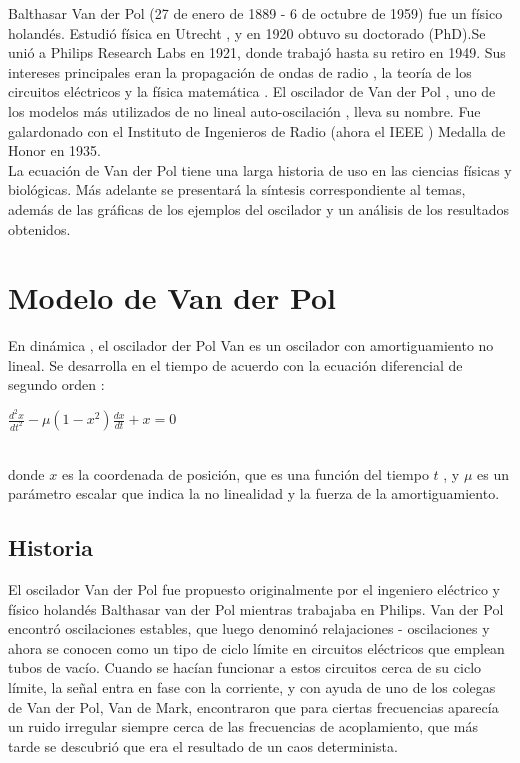 \documentclass[12pt]{article}
\begin{document}
Balthasar Van der Pol (27 de enero de 1889 - 6 de octubre de 1959) fue un físico holandés. Estudió física en Utrecht , y en 1920 obtuvo su doctorado (PhD).Se unió a Philips Research Labs en 1921, donde trabajó hasta su retiro en 1949. Sus intereses principales eran la propagación de ondas de radio , la teoría de los circuitos eléctricos y la física matemática . El oscilador de Van der Pol , uno de los modelos más utilizados de no lineal auto-oscilación , lleva su nombre. Fue galardonado con el Instituto de Ingenieros de Radio (ahora el IEEE ) Medalla de Honor en 1935. \\

La ecuación de Van der Pol tiene una larga historia de uso en las ciencias físicas y biológicas. Más adelante se presentará la síntesis correspondiente al temas, además de las gráficas de los ejemplos del oscilador y un análisis de los resultados obtenidos. 




\section*{Modelo de Van der Pol}
En dinámica , el oscilador der Pol Van es un oscilador con amortiguamiento no lineal. Se desarrolla en el tiempo de acuerdo con la ecuación diferencial de segundo orden :\\

\centerline{$\displaystyle \frac{d^2x}{dt^2} - \mu (1-x^2) \frac{dx}{dt} +x = 0$}
$ $\\
donde $x$ es la coordenada de posición, que es una función del tiempo $t$ , y $\mu$ es un parámetro escalar que indica la no linealidad y la fuerza de la amortiguamiento.




\subsection*{Historia}
El oscilador Van der Pol fue propuesto originalmente por el ingeniero eléctrico y físico holandés Balthasar van der Pol mientras trabajaba en Philips. Van der Pol encontró oscilaciones estables, que luego denominó relajaciones - oscilaciones y ahora se conocen como un tipo de ciclo límite en circuitos eléctricos que emplean tubos de vacío. Cuando se hacían funcionar a estos circuitos cerca de su ciclo límite, la señal entra en fase con la corriente, y con ayuda de uno de los colegas de Van der Pol, Van de Mark, encontraron que para ciertas frecuencias aparecía un ruido irregular siempre cerca de las frecuencias de acoplamiento, que más tarde se descubrió que era el resultado de un caos determinista. \\
\end{document}
